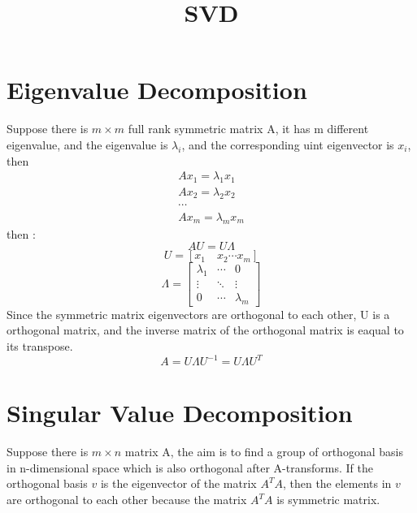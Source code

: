 \documentclass[]{article}
\title{SVD}
\author{}
\begin{document}
\maketitle

\begin{abstract}

\end{abstract}
\section{Eigenvalue Decomposition}
Suppose there is $m\times m$ full rank symmetric matrix A,  it has m different eigenvalue,  and the eigenvalue is $\lambda_{i}$,  and the corresponding uint eigenvector is $x_{i}$,  then 
\begin{equation}
 \begin{split}
    Ax_{1}=\lambda_{1}x_{1}\\
    Ax_{2}=\lambda_{2}x_{2}\\
    \cdots\\
    Ax_{m}=\lambda_{m}x_{m}
   \end{split}
\end{equation}
then :
\begin{equation}
   AU=U\Lambda
\end{equation}
\begin{equation}
  U=[x_{1}\quad x_{2} \cdots x_{m}]
\end{equation}
\begin{equation}
 \Lambda=\left[
 \begin{matrix}
  \lambda_{1}& \cdots & 0\\
  \vdots & \ddots & \vdots \\
  0&\cdots&\lambda_{m}  
 \end{matrix}\right]
\end{equation}
Since the symmetric matrix eigenvectors are orthogonal to each other, U is a orthogonal matrix, and the inverse matrix of the orthogonal matrix is eaqual to its transpose.
\begin{equation}
 A=U\Lambda U^{-1}=U \Lambda U^{T}
\end{equation}
\section{Singular Value Decomposition}
Suppose there is  $m\times n $ matrix A,  the aim is to find a group of orthogonal basis in n-dimensional space which is also orthogonal after A-transforms.  If the orthogonal basis $v$ is the eigenvector of the matrix $A^{T}A$,  then the elements in $v$ are orthogonal to each other because the matrix $A^{T}A$ is symmetric matrix.
\end{document}
